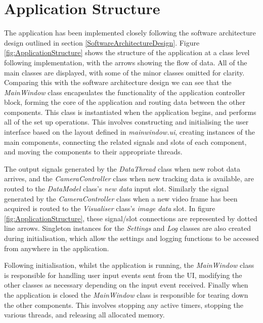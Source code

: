 
\section{Application Structure} \label{ApplicationStructure}
The application has been implemented closely following the software architecture design outlined in section \ref{SoftwareArchitectureDesign}. Figure \ref{fig:ApplicationStructure} shows the structure of the application at a class level following implementation, with the arrows showing the flow of data. All of the main classes are displayed, with some of the minor classes omitted for clarity. Comparing this with the software architecture design we can see that the \textit{MainWindow} class encapsulates the functionality of the application controller block, forming the core of the application and routing data between the other components. This class is instantiated when the application begins, and performs all of the set up operations. This involves constructing and initialising the user interface based on the layout defined in \textit{mainwindow.ui}, creating instances of the main components, connecting the related signals and slots of each component, and moving the components to their appropriate threads. 

The output signals generated by the \textit{DataThread} class when new robot data arrives, and the \textit{CameraController} class when new tracking data is available, are routed to the \textit{DataModel} class's \textit{new data} input slot. Similarly the signal generated by the \textit{CameraController} class when a new video frame has been acquired is routed to the \textit{Visualiser} class's \textit{image data} slot. In figure \ref{fig:ApplicationStructure}, these signal/slot connections are represented by dotted line arrows. Singleton instances for the \textit{Settings} and \textit{Log} classes are also created during initialisation, which allow the settings and logging functions to be accessed from anywhere in the application. 

Following initialisation, whilst the application is running, the \textit{MainWindow} class is responsible for handling user input events sent from the UI, modifying the other classes as necessary depending on the input event received. Finally when the application is closed the \textit{MainWindow} class is responsible for tearing down the other components. This involves stopping any active timers, stopping the various threads, and releasing all allocated memory.

